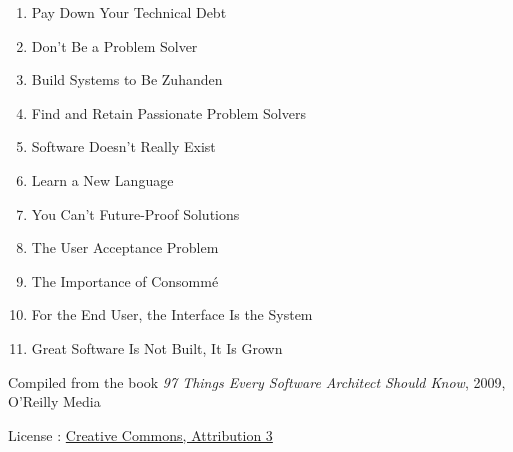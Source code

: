 \documentclass[10pt]{article}
\begin{document}
\begin{multicols}{4}
\begin{enumerate}
      \item Pay Down Your Technical Debt 
      \item Don't Be a Problem Solver 
      \item Build Systems to Be Zuhanden 
      \item Find and Retain Passionate Problem Solvers
      \item Software Doesn't Really Exist 
      \item Learn a New Language 
      \item You Can't Future-Proof Solutions 
      \item The User Acceptance Problem 
      \item The Importance of Consommé 
      \item For the End User, the Interface Is the System 
      \item Great Software Is Not Built, It Is Grown
    \end{enumerate}
  \end{multicols}
  
  \begin{flushright}
    {
      \footnotesize
      Compiled from the book \textit{97 Things Every Software Architect Should Know}, 2009, O'Reilly Media
      \par
      License : \href{http://creativecommons.org/licenses/by/3.0/us/}{Creative Commons, Attribution 3}
    }
  \end{flushright}
\end{document}
